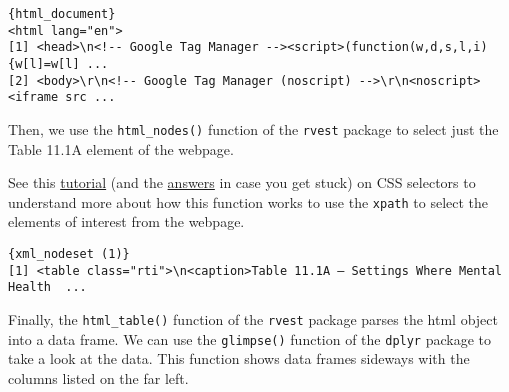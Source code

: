 \documentclass[
]{article}
\newenvironment{Shaded}{\begin{snugshade}}{\end{snugshade}}
\newcommand{\DataTypeTok}[1]{\textcolor[rgb]{0.13,0.29,0.53}{#1}}
\newcommand{\DecValTok}[1]{\textcolor[rgb]{0.00,0.00,0.81}{#1}}
\newcommand{\FloatTok}[1]{\textcolor[rgb]{0.00,0.00,0.81}{#1}}
\newcommand{\KeywordTok}[1]{\textcolor[rgb]{0.13,0.29,0.53}{\textbf{#1}}}
\newcommand{\NormalTok}[1]{#1}
\newcommand{\OperatorTok}[1]{\textcolor[rgb]{0.81,0.36,0.00}{\textbf{#1}}}
\newcommand{\StringTok}[1]{\textcolor[rgb]{0.31,0.60,0.02}{#1}}
\begin{document}
\begin{Shaded}
\end{Shaded}

\begin{verbatim}
{html_document}
<html lang="en">
[1] <head>\n<!-- Google Tag Manager --><script>(function(w,d,s,l,i){w[l]=w[l] ...
[2] <body>\r\n<!-- Google Tag Manager (noscript) -->\r\n<noscript><iframe src ...
\end{verbatim}

Then, we use the \texttt{html\_nodes()} function of the \texttt{rvest}
package to select just the Table 11.1A element of the webpage.

See this \href{http://flukeout.github.io/\#}{tutorial} (and the
\href{https://gist.github.com/chrisman/fcb0a88459cd98239dbe6d2d200b02d1}{answers}
in case you get stuck) on CSS selectors to understand more about how
this function works to use the \texttt{xpath} to select the elements of
interest from the webpage.

\begin{Shaded}
\end{Shaded}

\begin{verbatim}
{xml_nodeset (1)}
[1] <table class="rti">\n<caption>Table 11.1A – Settings Where Mental Health  ...
\end{verbatim}

Finally, the \texttt{html\_table()} function of the \texttt{rvest}
package parses the html object into a data frame. We can use the
\texttt{glimpse()} function of the \texttt{dplyr} package to take a look
at the data. This function shows data frames sideways with the columns
listed on the far left.

\begin{Shaded}
\end{Shaded}
\end{document}
